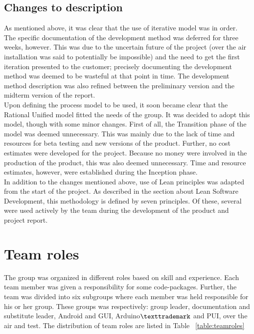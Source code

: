 \subsection{Changes to description} 
As mentioned above, it was clear that the use of iterative model was in order. The specific documentation of the development method was deferred for three weeks, however. This was due to the uncertain future of the project (over the air installation was said to potentially be impossible) and the need to get the first iteration presented to the customer; precisely documenting the development method was deemed to be wasteful at that point in time. The development method description was also refined between the preliminary version and the midterm version of the report. \\
\newline
Upon defining the process model to be used, it soon became clear that the Rational Unified model fitted the needs of the group. It was decided to adopt this model, though with some minor changes. First of all, the Transition phase of the model was deemed unnecessary. This was mainly due to the lack of time and resources for beta testing and new versions of the product. Further, no cost estimates were developed for the project. Because no money were involved in the production of the product, this was also deemed unnecessary. Time and resource estimates, however, were established during the Inception phase. \\
\newline
In addition to the changes mentioned above, use of Lean principles was adapted from the start of the project. As described in the section about Lean Software Development, this methodology is defined by seven principles. Of these, several were used actively by the team during the development of the product and project report. %

\section{Team roles}
The group was organized in different roles based on skill and experience. Each team member was given a responsibility for some code-packages. Further, the team was divided into six subgroups where each member was held responsible for his or her group. These groups was respectively: group leader, documentation and substitute leader, Android and GUI, Arduino$\texttrademark$ and PUI, over the air and test.
The distribution of team roles are listed in Table ~\ref{table:teamroles}

